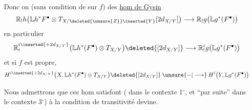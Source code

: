 Donc on  (sans condition de
 sur $f$) des \uline{hom de Gysin}
\[
\mathbb{R}_!h\bigl(\mathbb{L}h^*F^\bullet\otimes
 T_{X/\deleted{\unsure{Z}}\inserted{Y}}[2d_{X/Y}]\bigr)
 \longrightarrow \mathbb{R}_!g\bigl(\mathbb{L}g^*(F^\bullet)\bigr)
\]
en particulier
\[
\mathbb{R}_!^{i\inserted{+2d_{X/Y}}}
 \bigl(\mathbb{L}h^*(F^\bullet)\otimes T_{X/Y}\bigr)
 \deleted{[2d_{X/Y}]}
 \longrightarrow \mathbb{R}_!^ig\bigl(\mathbb{L}g^*(F^\bullet)\bigr)
\]
et si $f$ est propre, 
\[
H^{i\inserted{+2d_{X/Y}}}
 \bigl(X,\mathbb{L}h^*(F^\bullet)\otimes T_{X/Y}\bigr)
 \deleted{[2d_{X/Y}]}
 \mathbin{\unsure{-|\longrightarrow}}
 H^i\bigl(Y,\mathbb{L}g^*(F^\bullet)\bigr)
\]

Nous admettrons que ces hom satisfont
( dans le contexte 1$^\circ$, et ``par suite'' dans
le contexte 3$^\circ$) à la condition de
transitivité  devine.
